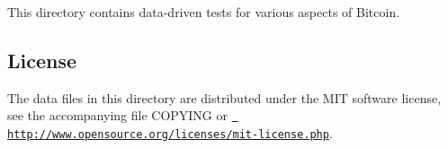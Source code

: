 This directory contains data-\/driven tests for various aspects of Bitcoin.

\subsection*{License }

The data files in this directory are distributed under the M\+IT software license, see the accompanying file C\+O\+P\+Y\+I\+NG or \href{http://www.opensource.org/licenses/mit-license.php}{\texttt{ http\+://www.\+opensource.\+org/licenses/mit-\/license.\+php}}. 